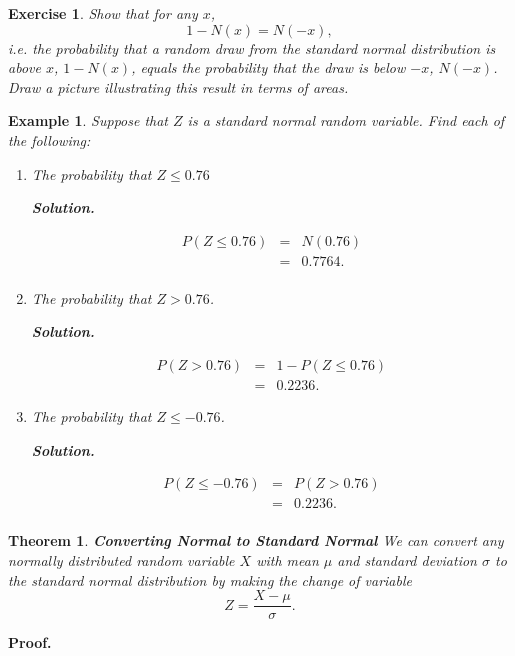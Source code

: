 \documentclass[letterpaper,10pt]{article}
\newtheorem{thm}{Theorem}
\newtheorem{ex}{Exercise}
\newtheorem{exa}{Example}[section]
\begin{document}
\begin{ex}
Show that for any $x$, $$1-N(x)=N(-x),$$  i.e. the probability that a random draw from the standard normal distribution is above $x$, $1-N(x)$, equals the probability that the draw is below $-x$, $N(-x)$.  Draw a picture illustrating this result in terms of areas.
\end{ex}

\begin{exa}
Suppose that $Z$ is a standard normal random variable.  Find each of the following:
\begin{enumerate}
\item[(a)] The probability that $Z\leq 0.76$

\noindent\textbf{Solution.} 

\begin{eqnarray*}
P(Z\leq 0.76)&=&N(0.76)\\
&=&0.7764.\\
\end{eqnarray*}

\item[(b)] The probability that $Z>0.76$.

\noindent\textbf{Solution.} 

\begin{eqnarray*}
P(Z>0.76)&=&1-P(Z\leq 0.76)\\
&=&0.2236.
\end{eqnarray*}

\item[(c)] The probability that $Z\leq -0.76$.

\noindent\textbf{Solution.} 

\begin{eqnarray*}
P(Z\leq -0.76)&=&P(Z>0.76)\\
&=&0.2236.\\
\end{eqnarray*}

\end{enumerate}
\end{exa}


\begin{thm}{\bf Converting Normal to Standard Normal}
We can convert any normally distributed random variable $X$ with mean $\mu$ and standard deviation $\sigma$ to the standard normal distribution by making the change of variable $$Z=\frac{X-\mu}{\sigma}.$$  

\end{thm}

\noindent\textbf{Proof.}
\end{document}
